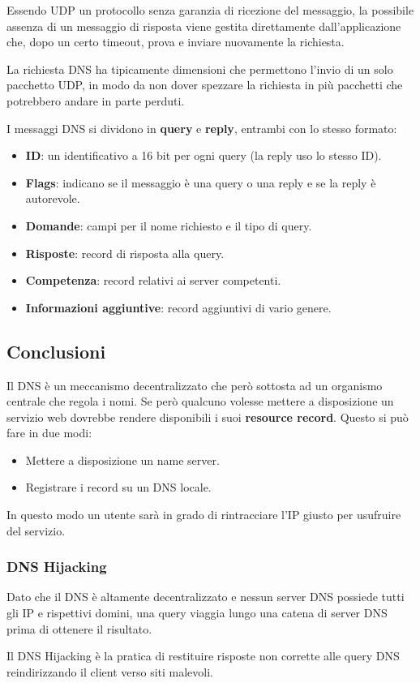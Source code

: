 Essendo UDP un protocollo senza garanzia di ricezione del messaggio, la possibile assenza di un
messaggio di risposta viene gestita direttamente dall'applicazione che, dopo un certo timeout,
prova e inviare nuovamente la richiesta.

La richiesta DNS ha tipicamente dimensioni che permettono l'invio di un solo pacchetto UDP, in
modo da non dover spezzare la richiesta in più pacchetti che potrebbero andare in parte perduti.

I messaggi DNS si dividono in \textbf{query} e \textbf{reply}, entrambi con lo stesso formato:
\begin{itemize}
	\item \textbf{ID}: un identificativo a 16 bit per ogni query (la reply uso lo stesso ID).
	\item \textbf{Flags}: indicano se il messaggio è una query o una reply e se la reply è
	      autorevole.
	\item \textbf{Domande}: campi per il nome richiesto e il tipo di query.
	\item \textbf{Risposte}: record di risposta alla query.
	\item \textbf{Competenza}: record relativi ai server competenti.
	\item \textbf{Informazioni aggiuntive}: record aggiuntivi di vario genere.
\end{itemize}

\subsection{Conclusioni}
Il DNS è un meccanismo decentralizzato che però sottosta ad un organismo centrale che regola i
nomi. Se però qualcuno volesse mettere a disposizione un servizio web dovrebbe rendere disponibili
i suoi \textbf{resource record}. Questo si può fare in due modi:
\begin{itemize}
	\item Mettere a disposizione un name server.
	\item Registrare i record su un DNS locale.
\end{itemize}
In questo modo un utente sarà in grado di rintracciare l'IP giusto per usufruire del servizio.

\subsubsection{DNS Hijacking}
Dato che il DNS è altamente decentralizzato e nessun server DNS possiede tutti gli IP e rispettivi
domini, una query viaggia lungo una catena di server DNS prima di ottenere il risultato.

Il DNS Hijacking è la pratica di restituire risposte non corrette alle query DNS reindirizzando
il client verso siti malevoli.
